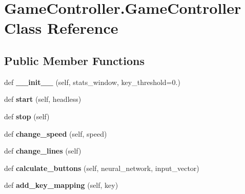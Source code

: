 \hypertarget{classGameController_1_1GameController}{}\section{Game\+Controller.\+Game\+Controller Class Reference}
\label{classGameController_1_1GameController}
\subsection*{Public Member Functions}
\begin{DoxyCompactItemize}
\item 
def {\bfseries \+\_\+\+\_\+init\+\_\+\+\_\+} (self, stats\+\_\+window, key\+\_\+threshold=0.)\hypertarget{classGameController_1_1GameController_a8e0ebfe57e0c1850047d4f271e296187}{}\label{classGameController_1_1GameController_a8e0ebfe57e0c1850047d4f271e296187}

\item 
def {\bfseries start} (self, headless)\hypertarget{classGameController_1_1GameController_a000e1b43edbc5454673763a491f53d27}{}\label{classGameController_1_1GameController_a000e1b43edbc5454673763a491f53d27}

\item 
def {\bfseries stop} (self)\hypertarget{classGameController_1_1GameController_adceb4b825410df4ac33c63732c5ebb1c}{}\label{classGameController_1_1GameController_adceb4b825410df4ac33c63732c5ebb1c}

\item 
def {\bfseries change\+\_\+speed} (self, speed)\hypertarget{classGameController_1_1GameController_a6e9c793d9f9c7f91ef86fdfbad1f399c}{}\label{classGameController_1_1GameController_a6e9c793d9f9c7f91ef86fdfbad1f399c}

\item 
def {\bfseries change\+\_\+lines} (self)\hypertarget{classGameController_1_1GameController_a6df31616562721415f855506ac39200e}{}\label{classGameController_1_1GameController_a6df31616562721415f855506ac39200e}

\item 
def {\bfseries calculate\+\_\+buttons} (self, neural\+\_\+network, input\+\_\+vector)\hypertarget{classGameController_1_1GameController_adfa21a1d6a41248487a720c5311eb5c7}{}\label{classGameController_1_1GameController_adfa21a1d6a41248487a720c5311eb5c7}

\item 
def {\bfseries add\+\_\+key\+\_\+mapping} (self, key)\hypertarget{classGameController_1_1GameController_a7828e77aa375bd536fe94f502cf177e5}{}\label{classGameController_1_1GameController_a7828e77aa375bd536fe94f502cf177e5}


\end{DoxyCompactItemize}
